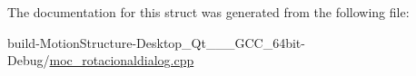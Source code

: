 The documentation for this struct was generated from the following file\-:\begin{DoxyCompactItemize}
\item 
build-\/\-Motion\-Structure-\/\-Desktop\-\_\-\-Qt\-\_\-\_\-\_\-\-G\-C\-C\-\_\-64bit-\/\-Debug/\hyperlink{moc__rotacionaldialog_8cpp}{moc\-\_\-rotacionaldialog.\-cpp}\end{DoxyCompactItemize}
